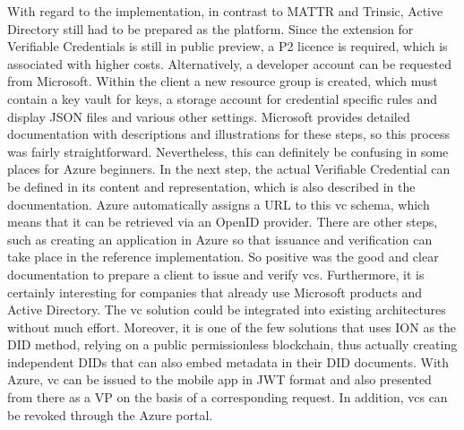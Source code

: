         With regard to the implementation, in contrast to MATTR and Trinsic, Active Directory still had to be prepared as the platform. Since the extension for Verifiable Credentials is still in public preview, a P2 licence is required, which is associated with higher costs. Alternatively, a developer account can be requested from Microsoft. Within the client a new resource group is created, which must contain a key vault for keys, a storage account for credential specific rules and display JSON files and various other settings. Microsoft provides detailed documentation with descriptions and illustrations for these steps, so this process was fairly straightforward. Nevertheless, this can definitely be confusing in some places for Azure beginners. In the next step, the actual Verifiable Credential can be defined in its content and representation, which is also described in the documentation. Azure automatically assigns a URL to this \ac{vc} schema, which means that it can be retrieved via an OpenID provider. There are other steps, such as creating an application in Azure so that issuance and verification can take place in the reference implementation. So positive was the good and clear documentation to prepare a client to issue and verify \acp{vc}. Furthermore, it is certainly interesting for companies that already use Microsoft products and Active Directory. The \ac{vc} solution could be integrated into existing architectures without much effort. Moreover, it is one of the few solutions that uses ION as the \ac{DID} method, relying on a public permissionless blockchain, thus actually creating independent \acp{DID} that can also embed metadata in their \ac{DID} documents. With Azure, \ac{vc} can be issued to the mobile app in JWT format and also presented from there as a \ac{VP} on the basis of a corresponding request. In addition, \acp{vc} can be revoked through the Azure portal.  
    
